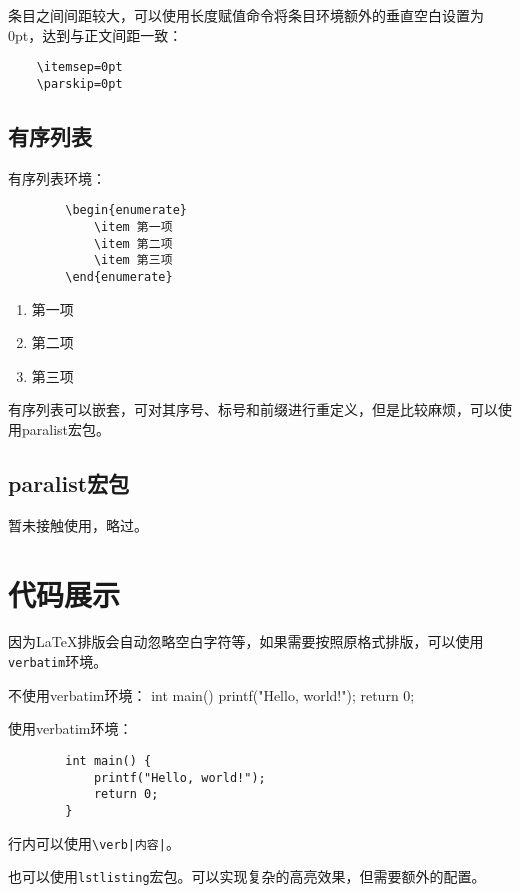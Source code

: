 条目之间间距较大，可以使用长度赋值命令将条目环境额外的垂直空白设置为0pt，达到与正文间距一致：

\begin{lstlisting}
    \itemsep=0pt
    \parskip=0pt
\end{lstlisting}


\subsection{有序列表}\label{subsec:enumerate}
有序列表环境：

\vspace{2em}
\begin{minipage}{0.45\textwidth}
    \begin{lstlisting}
        \begin{enumerate}
            \item 第一项
            \item 第二项
            \item 第三项
        \end{enumerate}
    \end{lstlisting}
\end{minipage}
\begin{minipage}{0.45\textwidth}
    \begin{enumerate}
        \item 第一项
        \item 第二项
        \item 第三项
    \end{enumerate}
\end{minipage}

有序列表可以嵌套，可对其序号、标号和前缀进行重定义，但是比较麻烦，可以使用paralist宏包。


\subsection{paralist宏包}\label{subsec:paralist}

暂未接触使用，略过。

\section{代码展示}\label{sec:codeshow}

因为\LaTeX{}排版会自动忽略空白字符等，如果需要按照原格式排版，可以使用\lstinline{verbatim}环境。


\begin{codeshow}
    不使用verbatim环境：
    int main() {
            printf("Hello, world!");
            return 0;
        }

    使用verbatim环境：
    \begin{verbatim}
        int main() {
            printf("Hello, world!");
            return 0;
        }
    \end{verbatim}
\end{codeshow}

行内可以使用\lstinline{\verb|内容|}。

也可以使用\lstinline{lstlisting}宏包。可以实现复杂的高亮效果，但需要额外的配置。

